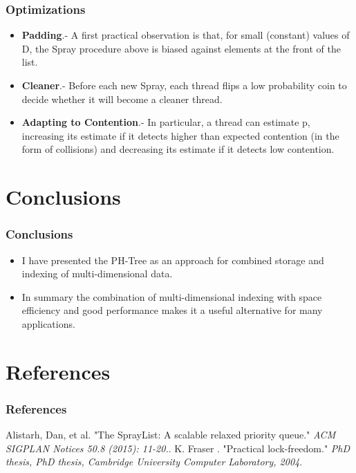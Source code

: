 \documentclass{beamer}
\begin{document}
\begin{frame}
\frametitle{Optimizations}
\begin{itemize}
\item \textbf{Padding}.- A first practical observation is that, for small (constant)
values of D, the Spray procedure above is biased against elements at the front of the list.

\item \textbf{Cleaner}.- Before each new Spray, each thread flips a low probability
coin to decide whether it will become a cleaner thread.
\item \textbf{Adapting to Contention}.- In particular, a thread can estimate p, increasing its estimate if it detects higher than expected contention (in the form of
collisions) and decreasing its estimate if it detects low contention. 
\end{itemize}
\end{frame}



\section{Conclusions}

\begin{frame}
\frametitle{Conclusions}
\begin{itemize}
\item I have presented the PH-Tree as an approach for combined storage and indexing of multi-dimensional data.

\item In summary the combination of multi-dimensional indexing with space efficiency and good performance makes it a useful alternative for many applications.
\end{itemize}
\end{frame}

\section{References}

\begin{frame}
\frametitle{References}
\footnotesize{
\begin{thebibliography}{99} 
     Alistarh, Dan, et al.
    \newblock "The SprayList: A scalable relaxed priority 						queue." 
    \newblock \emph{ ACM SIGPLAN Notices 50.8 (2015): 11-20.}.
    K. Fraser .
    \newblock "Practical lock-freedom." 
    \newblock \emph{ PhD thesis, PhD thesis, Cambridge
University Computer Laboratory, 2004}.
\end{thebibliography}
}
\end{frame}


\begin{frame}
\titlepage
\end{frame}

\end{document}
